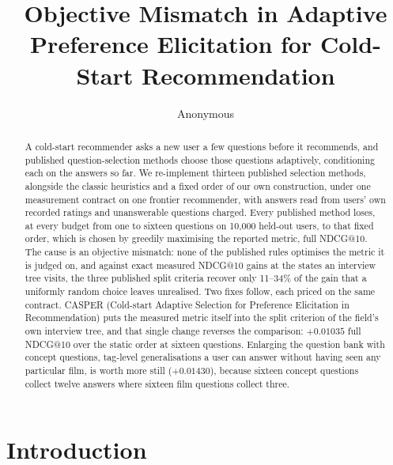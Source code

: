 \documentclass[runningheads]{llncs}
\begin{document}
\title{Objective Mismatch in Adaptive Preference Elicitation for Cold-Start Recommendation}

\author{Anonymous}

\maketitle

\begin{abstract}
A cold-start recommender asks a new user a few questions before it recommends, and published
question-selection methods choose those questions adaptively, conditioning each on the answers so
far. We re-implement thirteen published selection methods, alongside the classic heuristics and a fixed
order of our own construction, under one measurement contract on one frontier recommender, with answers read from users' own recorded ratings and unanswerable questions
charged. Every published method loses, at every budget from one to sixteen questions on 10{,}000
held-out users, to that fixed order, which is chosen by greedily maximising the reported metric,
full NDCG@10. The cause is an objective mismatch: none of the published rules optimises the metric it is
judged on, and against exact measured NDCG@10 gains at the states an interview tree visits, the three
published split criteria recover only 11--34\% of the gain that a uniformly random choice leaves
unrealised. Two fixes follow, each priced on the same contract. CASPER (Cold-start Adaptive Selection for
Preference Elicitation in Recommendation) puts the measured metric itself into the split criterion of
the field's own interview tree, and that single change reverses the comparison: $+0.01035$ full
NDCG@10 over the static order at sixteen questions. Enlarging the question bank with concept questions, tag-level generalisations a user can answer
without having seen any particular film, is worth more still ($+0.01430$), because sixteen concept
questions collect twelve answers where sixteen film questions collect three.
\end{abstract}

\section{Introduction}
\label{sec:intro}
\end{document}
